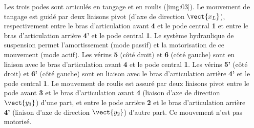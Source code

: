 Les trois podes sont articulés en tangage et en roulis (\autoref{img:03}). Le mouvement de tangage est guidé par deux liaisons pivot (d'axe de direction  $\vect{x_L}$), respectivement entre le bras d'articulation avant \textbf{4} et le pode central \textbf{1} et entre le bras d'articulation arrière \textbf{4'} et le pode central \textbf{1}. Le système hydraulique de suspension permet l'amortissement (mode passif) et la motorisation de ce mouvement (mode actif). Les vérins \textbf{5} (côté droit) et \textbf{6} (côté gauche) sont en liaison avec le bras d'articulation avant \textbf{4} et le pode central \textbf{1}. Les vérins \textbf{5'} (côté droit) et \textbf{6'} (côté gauche) sont en liaison avec le bras d'articulation arrière \textbf{4'} et le pode central \textbf{1}. Le mouvement de roulis est assuré par deux liaisons pivot entre le pode avant \textbf{3} et le bras d'articulation avant \textbf{4} (liaison d'axe de direction $\vect{y_3}$) d'une part, et entre le pode arrière \textbf{2} et le bras d'articulation arrière \textbf{4'}  (liaison d'axe de direction $\vect{y_2}$) d'autre part. Ce mouvement n'est pas motorisé. 
\fi

